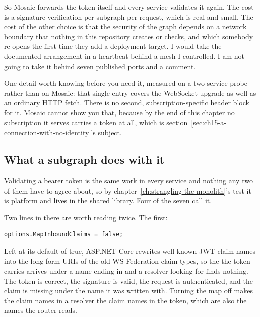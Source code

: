 So Mosaic forwards the token itself and every service validates it again. The
cost is a signature verification per subgraph per request, which is real and
small. The cost of the other choice is that the security of the graph depends on
a network boundary that nothing in this repository creates or checks, and which
somebody re-opens the first time they add a deployment target. I would take the
documented arrangement in a heartbeat behind a mesh I controlled. I am not going
to take it behind seven published ports and a comment.

%
One detail worth knowing before you need it, measured on a two-service probe
rather than on Mosaic: that single  entry covers the WebSocket
upgrade as well as an ordinary HTTP fetch. There is no second,
subscription-specific header block for it. Mosaic cannot show you that, because
by the end of this chapter no subscription it serves carries a token at all,
which is section~\ref{sec:ch15-a-connection-with-no-identity}'s subject.

\subsection*{What a subgraph does with it}

%
Validating a bearer token is the same work in every service and nothing any two
of them have to agree about, so by chapter~\ref{ch:strangling-the-monolith}'s
test it is platform and lives in the shared library. Four of the seven call it.

Two lines in there are worth reading twice. The first:

\begin{verbatim}
options.MapInboundClaims = false;
\end{verbatim}

Left at its default of true, ASP.NET Core rewrites well-known JWT claim names
into the long-form URIs of the old WS-Federation claim types, so the 
the token carries arrives under a name ending in  and a
resolver looking for  finds nothing. The token is correct, the
signature is valid, the request is authenticated, and the claim is missing under
the name it was written with. Turning the map off makes the claim names in a
resolver the claim names in the token, which are also the names the router
reads.

